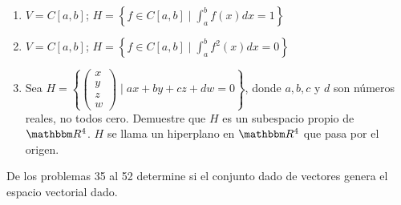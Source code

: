 \begin{enumerate}[resume]
    \item $V=C[a, b]$; $\displaystyle H=\left\{f \in C[a, b]\mid \int_{a}^{b} f(x) d x=1\right\}$
    \item $V=C[a, b]$; $\displaystyle H=\left\{f \in C[a, b]\mid \int_{a}^{b} f^{2}(x) d x=0\right\}$
    \item Sea $H=\left\{ \begin{pmatrix} x \\ y \\ z \\ w \end{pmatrix} \mid a x+b y+c z+d w=0\right\}$, donde $a, b, c$ y $d$ son números reales, no todos cero. Demuestre que $H$ es un subespacio propio de $\RR[4]$. $H$ se llama un hiperplano en $\RR[4]$ que pasa por el origen.
\end{enumerate}
De los problemas 35 al 52 determine si el conjunto dado de vectores genera el espacio vectorial dado.
